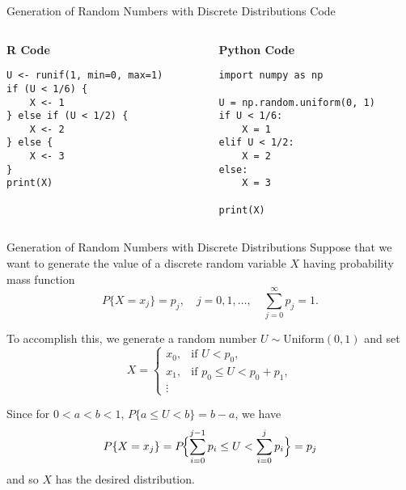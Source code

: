 \documentclass[8pt]{beamer}
\begin{document}
\begin{frame}[fragile]{Generation of Random Numbers with Discrete Distributions}
\alert{Code}
\begin{columns}[T]
\begin{column}{0.4\textwidth}
\textbf{R Code}
\begin{lstlisting}
U <- runif(1, min=0, max=1)
if (U < 1/6) {
    X <- 1
} else if (U < 1/2) {
    X <- 2
} else {
    X <- 3
}
print(X)
\end{lstlisting}
\end{column}

\begin{column}{0.4\textwidth}
\textbf{Python Code}
\begin{lstlisting}
import numpy as np

U = np.random.uniform(0, 1)
if U < 1/6:
    X = 1
elif U < 1/2:
    X = 2
else:
    X = 3

print(X)
\end{lstlisting}
\end{column}
\end{columns}
\end{frame}

\begin{frame}{Generation of Random Numbers with Discrete Distributions}
Suppose that we want to generate the value of a discrete random variable $X$ having probability mass function
\begin{equation*}
	P\{X = x_j\} = p_j, \quad j = 0, 1, \dots, \quad \sum_{j=0}^{\infty} p_j = 1.
\end{equation*}

To accomplish this, we generate a random number $U \sim \text{Uniform}(0,1)$ and set
\begin{equation*}
X =
\begin{cases}
x_0, & \text{if $U < p_0$},\\
x_1, & \text{if $p_0 \leq U < p_0 + p_1$},\\
        \vdots
\end{cases}
\end{equation*}

Since for $0 < a < b < 1$, $P\{a \leq U < b\} = b-a$, we have
\begin{equation*}
	P\{X = x_j\} = P\!\Bigl\{\sum_{i=0}^{j-1} p_i \leq U < \sum_{i=0}^{j} p_i\Bigr\} = p_j
\end{equation*}
and so $X$ has the desired distribution.
\end{frame}
\end{document}
